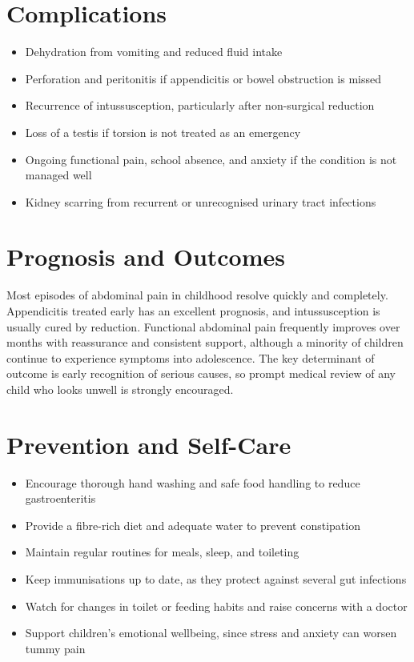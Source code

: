 \section*{Complications}
\begin{itemize}
    \item Dehydration from vomiting and reduced fluid intake
    \item Perforation and peritonitis if appendicitis or bowel obstruction is missed
    \item Recurrence of intussusception, particularly after non-surgical reduction
    \item Loss of a testis if torsion is not treated as an emergency
    \item Ongoing functional pain, school absence, and anxiety if the condition is not managed well
    \item Kidney scarring from recurrent or unrecognised urinary tract infections
\end{itemize}

\section*{Prognosis and Outcomes}
Most episodes of abdominal pain in childhood resolve quickly and completely. Appendicitis treated early has an excellent prognosis, and intussusception is usually cured by reduction. Functional abdominal pain frequently improves over months with reassurance and consistent support, although a minority of children continue to experience symptoms into adolescence. The key determinant of outcome is early recognition of serious causes, so prompt medical review of any child who looks unwell is strongly encouraged.

\section*{Prevention and Self-Care}
\begin{itemize}
    \item Encourage thorough hand washing and safe food handling to reduce gastroenteritis
    \item Provide a fibre-rich diet and adequate water to prevent constipation
    \item Maintain regular routines for meals, sleep, and toileting
    \item Keep immunisations up to date, as they protect against several gut infections
    \item Watch for changes in toilet or feeding habits and raise concerns with a doctor
    \item Support children's emotional wellbeing, since stress and anxiety can worsen tummy pain
\end{itemize}

